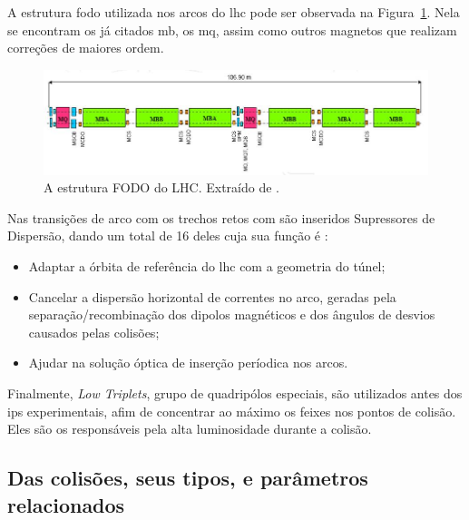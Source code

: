 A estrutura \gls{fodo} utilizada nos arcos do \gls{lhc} pode ser observada na
Figura~\ref{fig:fodo_lhc}. Nela se encontram os já citados \gls{mb}, os
\gls{mq}, assim como outros magnetos que realizam correções de maiores ordem. 

\begin{figure}[h!t]
\centering
\includegraphics[width=\textwidth]{imagens/fodo_lhc.jpg}
\caption{A estrutura FODO do LHC. Extraído de \cite{closerLook}.}
\label{fig:fodo_lhc}
\end{figure}

Nas transições de arco com os trechos retos com são inseridos 
Supressores de Dispersão, dando um total de 16 deles cuja sua função é
\cite{lhc_design}:

\begin{itemize}
\item Adaptar a órbita de referência do \gls{lhc} com a geometria do túnel;
\item Cancelar a dispersão horizontal de correntes no arco, geradas pela
separação/recombinação dos dipolos magnéticos e dos ângulos de desvios causados pelas
colisões;
\item Ajudar na solução óptica de inserção períodica nos arcos.
\end{itemize}

Finalmente, \emph{Low Triplets}, grupo de quadripólos especiais, são utilizados antes dos
\glspl{ip} experimentais, afim de concentrar ao máximo os feixes nos pontos de
colisão. Eles são os responsáveis pela alta luminosidade durante a colisão.

\subsection{Das colisões, seus tipos, e parâmetros relacionados}
\label{ssec:lhc_lum_choque}


